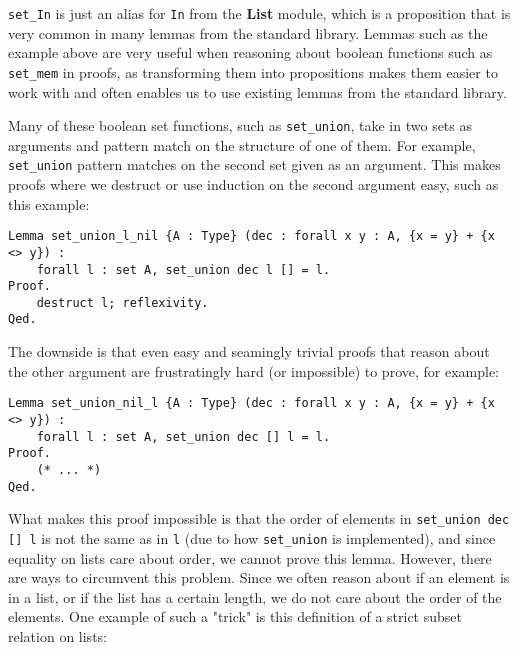 \lstinline{set_In} is just an alias for \lstinline{In} from the \textbf{List} module,
which is a proposition that is very common in many lemmas from the standard library.
Lemmas such as the example above are very useful when reasoning about boolean functions such as
\lstinline{set_mem} in proofs, as transforming them into propositions makes them easier to work with
and often enables us to use existing lemmas from the standard library.

Many of these boolean set functions, such as \lstinline{set_union},
take in two sets as arguments and pattern match on the structure of one of them.
For example, \lstinline{set_union} pattern matches on the second set given as an argument.
This makes proofs where we destruct or use induction on the second argument easy, such as this example:

\begin{minipage}{\linewidth}
\begin{lstlisting}[language=Coq, label={lst:set_op_ex1}, caption={Easy proof of lemma in \lstinline{ListSet} module}]
Lemma set_union_l_nil {A : Type} (dec : forall x y : A, {x = y} + {x <> y}) :
    forall l : set A, set_union dec l [] = l.
Proof.
    destruct l; reflexivity.
Qed.
\end{lstlisting}
\end{minipage}

The downside is that even easy and seamingly trivial proofs that reason about the other argument are frustratingly hard
(or impossible) to prove, for example:

\begin{minipage}{\linewidth}
\begin{lstlisting}[language=Coq, label={lst:set_op_ex2}, caption={Impossible proof of lemma in \lstinline{ListSet} module}]
Lemma set_union_nil_l {A : Type} (dec : forall x y : A, {x = y} + {x <> y}) :
    forall l : set A, set_union dec [] l = l.
Proof.
    (* ... *)
Qed.
\end{lstlisting}
\end{minipage}

What makes this proof impossible is that the order of elements in \lstinline{set_union dec [] l} is not the
same as in \lstinline{l} (due to how \lstinline{set_union} is implemented), and since equality on lists care about order,
we cannot prove this lemma.
However, there are ways to circumvent this problem.
Since we often reason about if an element is in a list, or if the list has a certain length,
we do not care about the order of the elements.
One example of such a "trick" is this definition of a strict subset relation on lists:

